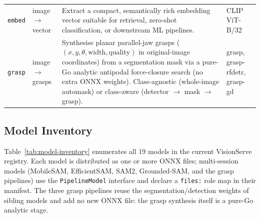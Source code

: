 \begin{table}[t]
\begin{tabular}{llp{6.2cm}l}
    \texttt{embed}         & image $\to$ vector &
      Extract a compact, semantically rich embedding vector suitable for
      retrieval, zero-shot classification, or downstream ML pipelines.
      &
      CLIP ViT-B/32 \\[4pt]

    \texttt{grasp}         & image $\to$ grasps &
      Synthesise planar parallel-jaw grasps ($(x,y,\theta,\text{width},\text{quality})$ in
      original-image coordinates) from a segmentation mask via a pure-Go analytic
      antipodal force-closure search (no extra ONNX weights).  Class-agnostic
      (whole-image automask) or class-aware (detector $\to$ mask $\to$ grasp).
      &
      grasp, grasp-rfdetr, grasp-gd \\
    \bottomrule
  \end{tabular}
\end{table}

\subsection{Model Inventory}
\label{sec:catalog:inventory}

Table~\ref{tab:model-inventory} enumerates all 19 models in the current VisionServe
registry.  Each model is distributed as one or more ONNX files; multi-session models
(MobileSAM, EfficientSAM, SAM2, Grounded-SAM, and the grasp pipelines) use the
\texttt{PipelineModel} interface and declare a \texttt{files:} role map in their manifest.
The three grasp pipelines reuse the segmentation/detection weights of sibling models and add
no new ONNX file: the grasp synthesis itself is a pure-Go analytic stage.

